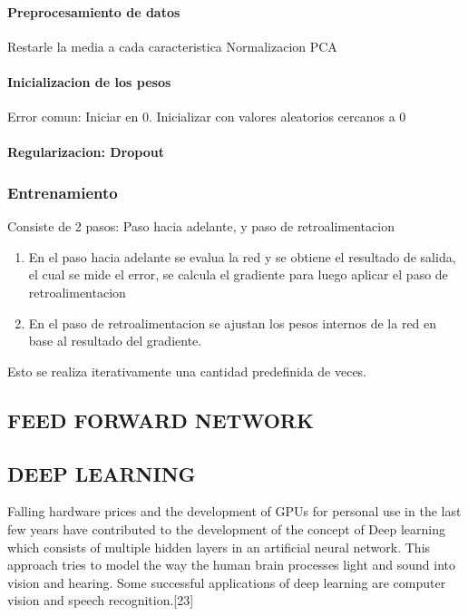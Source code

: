 \documentclass[a4paper,10pt]{article}
\begin{document}
\paragraph {Preprocesamiento de datos}
Restarle la media a cada caracteristica
Normalizacion
PCA

\paragraph {Inicializacion de los pesos}
Error comun: Iniciar en 0.
Inicializar con valores aleatorios cercanos a 0 

\paragraph {Regularizacion: Dropout}


\subsubsection {Entrenamiento}
Consiste de 2 pasos: Paso hacia adelante, y paso de retroalimentacion
  \begin{enumerate}
  \item En el paso hacia adelante se evalua la red y se obtiene el resultado de salida, el cual se mide el error, se calcula el gradiente para luego aplicar el paso de retroalimentacion
    \item En el paso de retroalimentacion se ajustan los pesos internos de la red en base al resultado del gradiente.
  \end{enumerate}
Esto se realiza iterativamente una cantidad predefinida de veces.

\subsection {FEED FORWARD NETWORK}


\subsection {DEEP LEARNING}
Falling hardware prices and the development of GPUs for personal use in the last few years have contributed to the development of the concept of Deep learning which consists 
of multiple hidden layers in an artificial neural network. This approach tries to model the way the human brain processes light and sound into vision and hearing. 
Some successful applications of deep learning are computer vision and speech recognition.[23]
\end{document}
